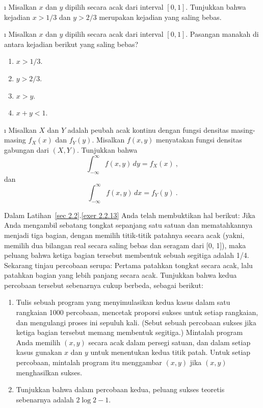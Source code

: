 \begin{LJSItem}
\i\label{exer 4.2.7} Misalkan $x$ dan $y$ dipilih secara acak dari interval $[0,1]$.  Tunjukkan
bahwa kejadian $x > 1/3$ dan $y > 2/3$ merupakan kejadian yang saling bebas.

\i\label{exer 4.2.8} Misalkan $x$ dan $y$ dipilih secara acak dari interval $[0,1]$.  Pasangan
manakah di antara kejadian berikut yang saling bebas?
\begin{enumerate}
\item $x > 1/3$.

\item $y > 2/3$.

\item $x > y$.

\item $x + y < 1$.
\end{enumerate}

\i\label{exer 4.2.8.5}  Misalkan $X$ dan $Y$ adalah peubah acak kontinu dengan
fungsi densitas masing-masing $f_X(x)$ dan $f_Y(y)$.  Misalkan $f(x, y)$ menyatakan fungsi
densitas gabungan dari $(X, Y)$.  Tunjukkan bahwa
$$
\int_{-\infty}^\infty f(x, y)\, dy = f_X(x)\ ,
$$ dan
$$
\int_{-\infty}^\infty f(x, y)\, dx = f_Y(y)\ .
$$


\istar\label{exer 4.2.9} Dalam Latihan~\ref{sec 2.2}.\ref{exer 2.2.13} Anda
telah membuktikan hal berikut: Jika Anda mengambil sebatang tongkat sepanjang satu satuan dan mematahkannya menjadi tiga bagian,
dengan memilih titik-titik patahnya secara acak (yakni, memilih dua bilangan real secara saling bebas 
dan seragam dari [0, 1]), maka peluang bahwa ketiga bagian tersebut membentuk
sebuah segitiga adalah 1/4.  Sekarang tinjau percobaan serupa: Pertama patahkan tongkat secara
acak, lalu patahkan bagian yang lebih panjang secara acak.  Tunjukkan bahwa kedua percobaan
tersebut sebenarnya cukup berbeda, sebagai berikut:
\begin{enumerate}
\item Tulis sebuah program yang menyimulasikan kedua kasus dalam satu rangkaian 1000 percobaan,
mencetak proporsi sukses untuk setiap rangkaian, dan mengulangi proses ini
sepuluh kali.  (Sebut sebuah percobaan sukses jika ketiga bagian tersebut memang membentuk segitiga.) 
Mintalah program Anda memilih $(x,y)$ secara acak dalam persegi satuan, dan dalam setiap kasus
gunakan $x$ dan $y$ untuk menentukan kedua titik patah.  Untuk setiap percobaan, mintalah program itu menggambar
$(x,y)$ jika $(x,y)$ menghasilkan sukses.

\item Tunjukkan bahwa dalam percobaan kedua, peluang sukses teoretis
sebenarnya adalah $2\log 2 - 1$.
\end{enumerate}


\end{LJSItem}
